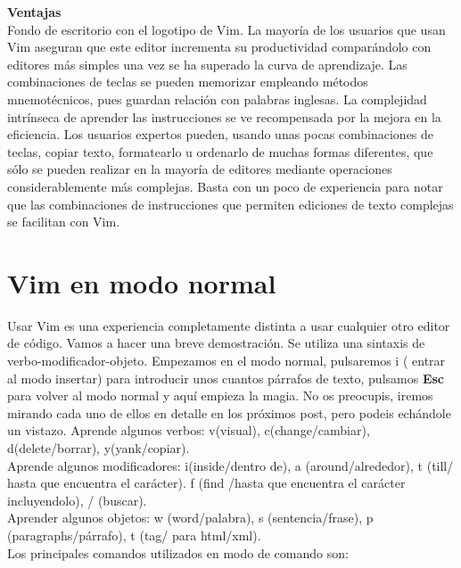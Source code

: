 \documentclass[a4paper,12pt,spanish]{article}
\begin{document}
\textbf{Ventajas}\\

Fondo de escritorio con el logotipo de Vim.
La mayoría de los usuarios que usan Vim aseguran que este editor incrementa su productividad comparándolo con editores más simples una vez se ha superado la curva de aprendizaje. Las combinaciones de teclas se pueden memorizar empleando métodos mnemotécnicos, pues guardan relación con palabras inglesas. La complejidad intrínseca de aprender las instrucciones se ve recompensada por la mejora en la eficiencia. Los usuarios expertos pueden, usando unas pocas combinaciones de teclas, copiar texto, formatearlo u ordenarlo de muchas formas diferentes, que sólo se pueden realizar en la mayoría de editores mediante operaciones considerablemente más complejas. Basta con un poco de experiencia para notar que las combinaciones de instrucciones que permiten ediciones de texto complejas se facilitan con Vim.

\section{Vim en modo normal}
\label{sec:vim-en-modo}

Usar Vim es una experiencia completamente distinta a usar cualquier
otro editor de código. Vamos a hacer una breve demostración. Se
utiliza una sintaxis de verbo-modificador-objeto.  Empezamos en el
modo normal, pulsaremos i ( entrar al modo insertar) para introducir
unos cuantos párrafos de texto, pulsamos \textbf{Esc} para volver al
modo normal y aquí empieza la magia. No os preocupis, iremos mirando
cada uno de ellos en detalle en los próximos post, pero podeis
echándole un vistazo.
Aprende algunos verbos: v(visual), c(change/cambiar),
d(delete/borrar), y(yank/copiar).\\

Aprende algunos modificadores: i(inside/dentro de), a
(around/alrededor), t (till/ hasta que encuentra el carácter). f (find
/hasta que encuentra el carácter incluyendolo), / (buscar).\\
Aprender algunos objetos: w (word/palabra), s (sentencia/frase), p
(paragraphs/párrafo), t (tag/ para html/xml). \\

Los principales comandos utilizados en modo de comando son:
\end{document}
